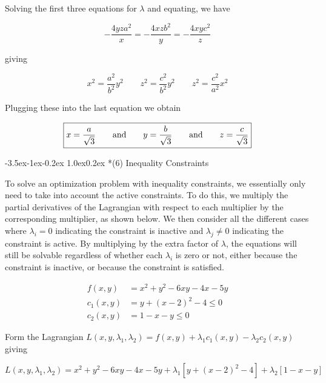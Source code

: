 \documentclass[11pt,letterpaper,onecolumn,notitlepage]{article}
\makeatletter
\renewcommand\section{\@startsection{section}{1}{\z@}%
{-3.5ex\@plus-1ex\@minus-0.2ex}%
{1.0ex\@plus0.2ex}%
{\fontsize{12pt}{12pt}\selectfont\bfseries\sffamily}}
\makeatother
\begin{document}
  Solving the first three equations for $\lambda$ and equating, we have

  \begin{equation*}
    -\frac{4yza^{2}}{x}=-\frac{4xzb^{2}}{y}=-\frac{4xyc^{2}}{z}
  \end{equation*}

  giving

  \begin{equation*}
    x^{2}=\frac{a^{2}}{b^{2}}y^{2}
    \qquad
    z^{2}=\frac{c^{2}}{b^{2}}y^{2}
    \qquad
    z^{2}=\frac{c^{2}}{a^{2}}x^{2}
  \end{equation*}

  Plugging these into the last equation we obtain

  \begin{equation*}
    \boxed{%
      x=\frac{a}{\sqrt{3}}
      \qquad\text{and}\qquad
      y=\frac{b}{\sqrt{3}}
      \qquad\text{and}\qquad
      z=\frac{c}{\sqrt{3}}}
  \end{equation*}

  \clearpage
  \section*{(6) Inequality Constraints}

  To solve an optimization problem with inequality constraints, we essentially only need to take into account the active constraints.
  To do this, we multiply the partial derivatives of the Lagrangian with respect to each multiplier by the corresponding multiplier, as shown below.
  We then consider all the different cases where $\lambda_{i}=0$ indicating the constraint is inactive and $\lambda_{j}\neq0$ indicating the constraint is active.
  By multiplying by the extra factor of $\lambda$, the equations will still be solvable regardless of whether each $\lambda_{i}$ is zero or not, either because the constraint is inactive, or because the constraint is satisfied.

  \begin{align*}
    f(x,y)     &= x^{2}+y^{2}-6xy-4x-5y \\
    c_{1}(x,y) &= y+(x-2)^{2}-4\leq0 \\
    c_{2}(x,y) &= 1-x-y\leq0
  \end{align*}

  Form the Lagrangian $L(x,y,\lambda_{1},\lambda_{2})=f(x,y)+\lambda_{1}c_{1}(x,y)-\lambda_{2}c_{2}(x,y)$ giving

  \begin{equation*}
    L(x,y,\lambda_{1},\lambda_{2})=x^{2}+y^{2}-6xy-4x-5y+\lambda_{1}\left[y+(x-2)^{2}-4\right]+\lambda_{2}\left[1-x-y\right]
  \end{equation*}
\end{document}
